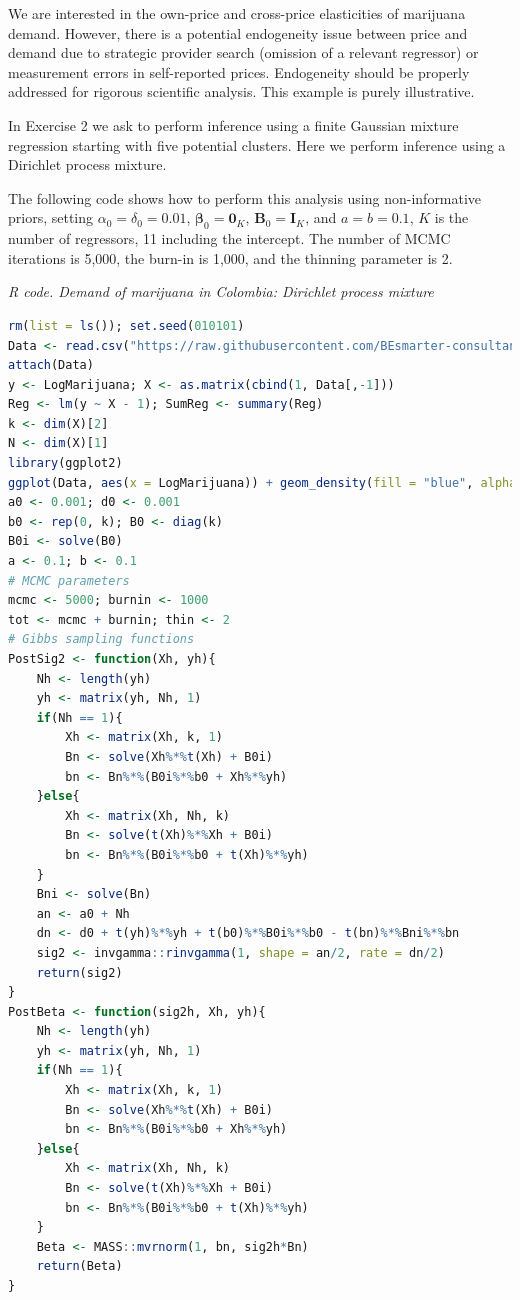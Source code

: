 We are interested in the own-price and cross-price elasticities of marijuana demand. However, there is a potential endogeneity issue between price and demand due to strategic provider search (omission of a relevant regressor) or measurement errors in self-reported prices. Endogeneity should be properly addressed for rigorous scientific analysis. This example is purely illustrative.

In Exercise 2 we ask to perform inference using a finite Gaussian mixture regression starting with five potential clusters. Here we perform inference using a Dirichlet process mixture.

The following code shows how to perform this analysis using non-informative priors, setting $\alpha_{0}=\delta_{0}=0.01$, $\boldsymbol{\beta}_{0}=\boldsymbol{0}_K$, $\boldsymbol{B}_{0}=\boldsymbol{I}_K$, and $a=b=0.1$, $K$ is the number of regressors, 11 including the intercept. The number of MCMC iterations is 5,000, the burn-in is 1,000, and the thinning parameter is 2.

\begin{tcolorbox}[enhanced,width=4.67in,center upper,
	fontupper=\large\bfseries,drop shadow southwest,sharp corners]
	\textit{R code. Demand of marijuana in Colombia: Dirichlet process mixture}
	\begin{VF}
		\begin{lstlisting}[language=R]
rm(list = ls()); set.seed(010101)
Data <- read.csv("https://raw.githubusercontent.com/BEsmarter-consultancy/BSTApp/refs/heads/master/DataApp/MarijuanaColombia.csv")
attach(Data)
y <- LogMarijuana; X <- as.matrix(cbind(1, Data[,-1]))
Reg <- lm(y ~ X - 1); SumReg <- summary(Reg)
k <- dim(X)[2]
N <- dim(X)[1]
library(ggplot2)
ggplot(Data, aes(x = LogMarijuana)) + geom_density(fill = "blue", alpha = 0.3) + labs(title = "Density Plot: Marijuana (log) monthly consumption in Colombia", x = "y", y = "Density") + theme_minimal()
a0 <- 0.001; d0 <- 0.001
b0 <- rep(0, k); B0 <- diag(k)
B0i <- solve(B0)
a <- 0.1; b <- 0.1
# MCMC parameters
mcmc <- 5000; burnin <- 1000
tot <- mcmc + burnin; thin <- 2
# Gibbs sampling functions
PostSig2 <- function(Xh, yh){
	Nh <- length(yh)
	yh <- matrix(yh, Nh, 1)
	if(Nh == 1){
		Xh <- matrix(Xh, k, 1)
		Bn <- solve(Xh%*%t(Xh) + B0i)
		bn <- Bn%*%(B0i%*%b0 + Xh%*%yh)
	}else{
		Xh <- matrix(Xh, Nh, k)
		Bn <- solve(t(Xh)%*%Xh + B0i)
		bn <- Bn%*%(B0i%*%b0 + t(Xh)%*%yh)
	}
	Bni <- solve(Bn)
	an <- a0 + Nh
	dn <- d0 + t(yh)%*%yh + t(b0)%*%B0i%*%b0 - t(bn)%*%Bni%*%bn 
	sig2 <- invgamma::rinvgamma(1, shape = an/2, rate = dn/2)
	return(sig2)
}
PostBeta <- function(sig2h, Xh, yh){
	Nh <- length(yh)
	yh <- matrix(yh, Nh, 1)
	if(Nh == 1){
		Xh <- matrix(Xh, k, 1)
		Bn <- solve(Xh%*%t(Xh) + B0i)
		bn <- Bn%*%(B0i%*%b0 + Xh%*%yh)
	}else{
		Xh <- matrix(Xh, Nh, k)
		Bn <- solve(t(Xh)%*%Xh + B0i)
		bn <- Bn%*%(B0i%*%b0 + t(Xh)%*%yh)
	}
	Beta <- MASS::mvrnorm(1, bn, sig2h*Bn)
	return(Beta)
}
\end{lstlisting}
	\end{VF}
\end{tcolorbox}
 
